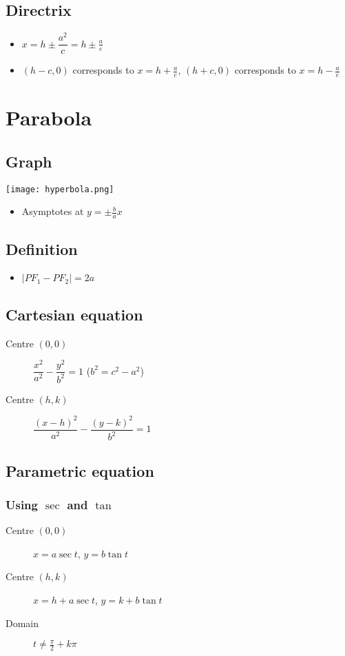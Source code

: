 \subsection{Directrix}
\begin{itemize}
    \item $x=h\pm \dfrac{a^2}{c} = h\pm\frac{a}{e}$
    \item $(h-c, 0)$ corresponds to $x=h+\frac{a}{e}$, $(h+c, 0)$ corresponds to $x=h-\frac{a}{e}$
\end{itemize}


\section{Parabola}
\subsection{Graph}
\texttt{[image: hyperbola.png]}
\begin{itemize}
    \item Asymptotes at $y=\pm \frac{b}{a}x$
\end{itemize}
\subsection{Definition}
\begin{itemize}
    \item $|PF_1 - PF_2| = 2a$
\end{itemize}
\subsection{Cartesian equation}
\begin{description}
    \item[Centre $(0,0)$] $\dfrac{x^2}{a^2}-\dfrac{y^2}{b^2}=1$ ($b^2=c^2-a^2$)
    \item[Centre $(h,k)$] $\dfrac{(x-h)^2}{a^2}-\dfrac{(y-k)^2}{b^2}=1$
\end{description}
\subsection{Parametric equation}
\subsubsection{Using $\sec$ and $\tan$}
\begin{description}
    \item[Centre $(0,0)$] $x=a\sec t$, $y=b\tan t$
    \item[Centre $(h,k)$] $x=h+a\sec t$, $y=k+b\tan t$
    \item[Domain] $t\neq \frac{\pi}{2}+k\pi$
\end{description}
